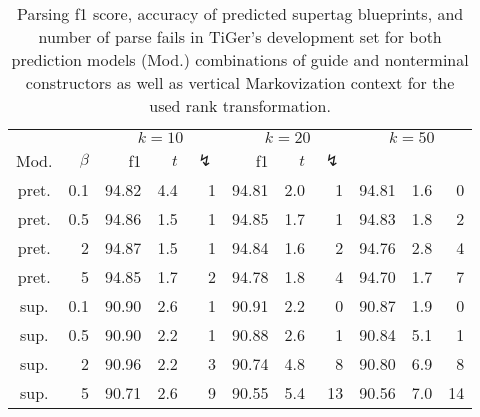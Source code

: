 \documentclass[../../document.tex]{subfiles}
\begin{document}
    \begin{table}
        \caption{\label{tbl:experiments:dptb:k}
        Parsing f1 score, accuracy of predicted  supertag blueprints, and number of parse fails in TiGer's development set for both prediction models (Mod.) combinations of guide and nonterminal constructors as well as vertical Markovization context for the used rank transformation.
        }
        \centering
        \setlength{\tabcolsep}{4pt}
        \vspace{.2cm}
        \begin{tabular}{cr|rrr|rrr|rrr}
            \toprule
&     &       \multicolumn{3}{c|}{$k = 10$} & \multicolumn{3}{c|}{$k = 20$} & \multicolumn{3}{c|}{$k = 50$} \\
Mod. &  $\beta$  & f1 & $t$ & $\lightning$ & f1 & $t$ & $\lightning$ \\ \hline
pret. & 0.1  & 94.82 & 4.4 & 1 & 94.81 & 2.0 & 1 & 94.81 & 1.6 & 0 \\
pret. & 0.5  & 94.86 & 1.5 & 1 & 94.85 & 1.7 & 1 & 94.83 & 1.8 & 2 \\
pret. &   2  & 94.87 & 1.5 & 1 & 94.84 & 1.6 & 2 & 94.76 & 2.8 & 4 \\
pret. &   5  & 94.85 & 1.7 & 2 & 94.78 & 1.8 & 4 & 94.70 & 1.7 & 7 \\
\midrule 
sup. & 0.1  & 90.90 & 2.6 & 1 & 90.91 & 2.2 &  0 & 90.87 & 1.9 &  0 \\
sup. & 0.5  & 90.90 & 2.2 & 1 & 90.88 & 2.6 &  1 & 90.84 & 5.1 &  1 \\
sup. &   2  & 90.96 & 2.2 & 3 & 90.74 & 4.8 &  8 & 90.80 & 6.9 &  8 \\
sup. &   5  & 90.71 & 2.6 & 9 & 90.55 & 5.4 & 13 & 90.56 & 7.0 & 14 \\
    \bottomrule
        \end{tabular}
    \end{table}
\end{document}
